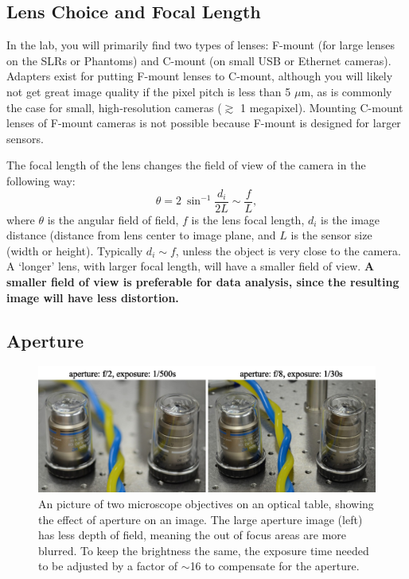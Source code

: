 \documentclass[11pt]{amsart}
\begin{document}
\subsection{Lens Choice and Focal Length}
In the lab, you will primarily find two types of lenses: F-mount (for large lenses on the SLRs or Phantoms) and C-mount (on small USB or Ethernet cameras). 
Adapters exist for putting F-mount lenses to C-mount, although you will likely not get great image quality if the pixel pitch is less than 5 $\mu$m, as is commonly the case for small, high-resolution cameras ($\gtrsim$ 1 megapixel).
Mounting C-mount lenses of F-mount cameras is not possible because F-mount is designed for larger sensors.

The focal length of the lens changes the field of view of the camera in the following way:
$$
\theta = 2\ \sin^{-1}\frac{d_i}{2L} \sim \frac{f}{L},
$$
where $\theta$ is the angular field of field, $f$ is the lens focal length, $d_i$ is the image distance (distance from lens center to image plane, and $L$ is the sensor size (width or height).
Typically $d_i \sim f$, unless the object is very close to the camera.
A `longer' lens, with larger focal length, will have a smaller field of view.
{\bf A smaller field of view is preferable for data analysis, since the resulting image will have less distortion.}

\subsection{Aperture}
\begin{figure}
\includegraphics{figures/aperture-300dpi.jpg}
\caption{
An picture of two microscope objectives on an optical table, showing the effect of aperture on an image.  
The large aperture image (left) has less depth of field, meaning the out of focus areas are more blurred.
To keep the brightness the same, the exposure time needed to be adjusted by a factor of $\sim$16 to compensate for the aperture.
}
\label{fig:blur}
\end{figure}
\end{document}
